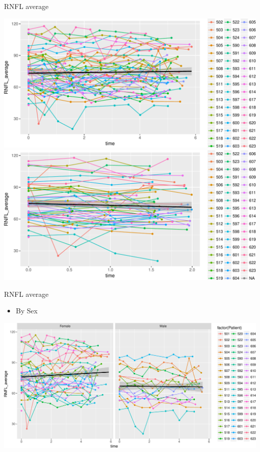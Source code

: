 \documentclass[ignorenonframetext,]{beamer}
\providecommand{\tightlist}{%
  \setlength{\itemsep}{0pt}\setlength{\parskip}{0pt}}
\begin{document}
\begin{frame}{RNFL average}

\includegraphics{analisi_exp_markdown_files/figure-beamer/unnamed-chunk-9-1.pdf}
\includegraphics{analisi_exp_markdown_files/figure-beamer/unnamed-chunk-9-2.pdf}

\end{frame}

\begin{frame}{RNFL average}

\begin{itemize}
\tightlist
\item
  By Sex
\end{itemize}

\includegraphics{analisi_exp_markdown_files/figure-beamer/unnamed-chunk-10-1.pdf}

\end{frame}
\end{document}

